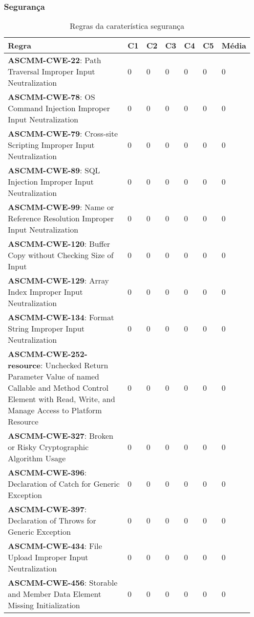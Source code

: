 \documentclass[openany,10pt,a4paper]{article}
\begin{document}
\subsubsection{Segurança}
	\begin{longtable}{p{3.2in}|p{0.28in}|p{0.28in}|p{0.28in}|p{0.28in}|p{0.28in}|p{0.35in}}
		\caption{Regras da caraterística segurança}
		\label{variability_impl_mech}
		\endhead
		\hline	
		\textbf{Regra} & \textbf{C1} & \textbf{C2} & \textbf{C3} & \textbf{C4} & \textbf{C5} & \textbf{Média} \\ \hline
		\textbf{ASCMM-CWE-22}: Path Traversal Improper Input Neutralization & 0 & 0 & 0 & 0 & 0 & 0 \\ \hline
		\textbf{ASCMM-CWE-78}: OS Command Injection Improper Input Neutralization & 0 & 0 & 0 & 0 & 0 & 0 \\ \hline
		\textbf{ASCMM-CWE-79}: Cross-site Scripting Improper Input Neutralization & 0 & 0 & 0 & 0 & 0 & 0 \\ \hline
		\textbf{ASCMM-CWE-89}: SQL Injection Improper Input Neutralization & 0 & 0 & 0 & 0 & 0 & 0 \\ \hline
		\textbf{ASCMM-CWE-99}: Name or Reference Resolution Improper Input Neutralization & 0 & 0 & 0 & 0 & 0 & 0 \\ \hline
		\textbf{ASCMM-CWE-120}: Buffer Copy without Checking Size of Input & 0 & 0 & 0 & 0 & 0 & 0 \\ \hline
		\textbf{ASCMM-CWE-129}: Array Index Improper Input Neutralization & 0 & 0 & 0 & 0 & 0 & 0 \\ \hline
		\textbf{ASCMM-CWE-134}: Format String Improper Input Neutralization & 0 & 0 & 0 & 0 & 0 & 0 \\ \hline
		\textbf{ASCMM-CWE-252-resource}: Unchecked Return Parameter Value of named Callable and Method Control Element with Read, Write, and Manage Access to Platform Resource & 0 & 0 & 0 & 0 & 0 & 0 \\ \hline
		\textbf{ASCMM-CWE-327}: Broken or Risky Cryptographic Algorithm Usage & 0 & 0 & 0 & 0 & 0 & 0 \\ \hline
		\textbf{ASCMM-CWE-396}: Declaration of Catch for Generic Exception & 0 & 0 & 0 & 0 & 0 & 0 \\ \hline
		\textbf{ASCMM-CWE-397}: Declaration of Throws for Generic Exception & 0 & 0 & 0 & 0 & 0 & 0 \\ \hline
		\textbf{ASCMM-CWE-434}: File Upload Improper Input Neutralization & 0 & 0 & 0 & 0 & 0 & 0 \\ \hline
		\textbf{ASCMM-CWE-456}: Storable and Member Data Element Missing Initialization & 0 & 0 & 0 & 0 & 0 & 0 \\ \hline

\end{longtable}
\end{document}
